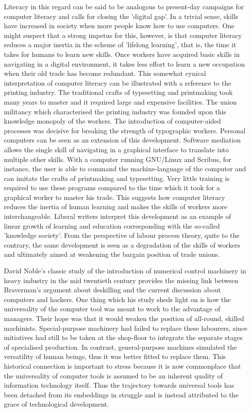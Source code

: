 Literacy in this regard can be said to be analogous to present-day campaigns for
computer literacy and calls for closing the 'digital gap'. In a trivial sense,
skills have increased in society when more people know how to use computers. One
might suspect that a strong impetus for this, however, is that computer literacy
reduces a major inertia in the scheme of 'lifelong learning', that is, the time
it takes for humans to learn new skills. Once workers have acquired basic skills
in navigating in a digital environment, it takes less ef\hbox{}fort to learn a new
occupation when their old trade has become redundant. This somewhat cynical
interpretation of computer literacy can be illustrated with a reference to the
printing industry. The traditional crafts of typesetting and printmaking took
many years to master and it required large and expensive facilities. The union
militancy which characterised the printing industry was founded upon this
knowledge monopoly of the workers. The introduction of computer-aided processes
was decisive for breaking the strength of typographic
workers\cite{gnunited-zimbalist79}. Personal computers can be seen as an
extension of this development. Software mediation allows the single skill of
navigating in a graphical interface to translate into multiple other skills.
With a computer running GNU/Linux and Scribus, for instance, the user is able to
command the machine-language of the computer and can imitate the crafts of
printmaking and typesetting. Very little training is required to use these
programs compared to the time which it took for a graphical worker to master his
trade. This suggests how computer literacy reduces the inertia of human learning
and makes the skills of workers more interchangeable. Liberal writers interpret
this development as an example of linear growth of learning and education
corresponding with the so-called 'knowledge society'. From the perspective of
labour process theory, quite to the contrary, the same development is seen as a
degradation of the skills of workers and ultimately aimed at weakening the
bargain position of trade unions. 

David Noble's classic study of the introduction of numerical control machinery
in heavy industry in the mid twentieth century provides the missing link between
Braverman's argument about deskilling and the current discussion about computers
and hackers. One thing which his study sheds light on is how the universality of
the computer tool was meant to work to the advantage of managers. Their hope was
that it would weaken the position of all-round, skilled machinists.
Special-purpose machinery had failed to replace these labourers, since
initiatives had still to be taken at the shop-f\hbox{}loor to integrate the separate
stages of specialised production. In contrast, general-purpose machines
simulated the versatility of human beings, thus it was better f\hbox{}itted to
replace them\cite{gnunited-noble84}. This historical connection is important to
stress because it is now commonplace that the universality of computer tools is
assumed to be an inherent quality of information technology itself. Thus the
trajectory towards universal tools has been detached from its embeddings in
struggle and is instead attributed to the grace of technological development. 

